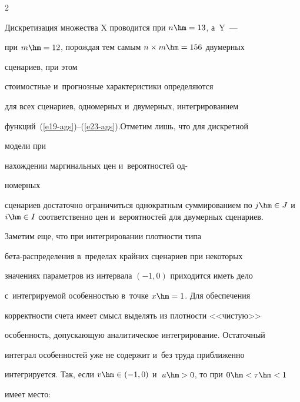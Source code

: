 \begin{multicols}{2}
  


  Дискретизация множества {\sf X} проводится при $n\hm=13$, а~{\sf Y}~--- 


при $m \hm= 12$, порождая тем самым $n\times m\hm= 156$ двумерных 


сценариев, при этом\linebreak


 стоимостные и~прогнозные характеристики опре\-деляются 


для всех сценариев, одномерных и~дву\-мерных, интегрированием 


функций~(\ref{e19-ags})--(\ref{e23-ags}).\linebreak Отметим лишь, что для дискретной 


модели при


 нахождении маргинальных цен и~вероятностей од-\linebreak\vspace*{-12pt}





\columnbreak





\noindent


номерных 


сценариев достаточно ограничиться однократным суммированием по $j\hm\in 


J$ и~$i\hm\in I$ соответственно цен и~вероятностей для двумерных сценариев. 


  


  Заметим еще, что при интегрировании плот\-ности типа 


 бе\-та-рас\-пре\-де\-ле\-ния в~пределах крайних сценариев при некоторых 


значениях параметров из интервала $(-1, 0)$ приходится иметь дело 


с~интегрируемой особенностью в~точке $x\hm= 1$. Для обеспечения 


корректности счета имеет смысл выделять из плотности <<чистую>> 


особенность, допускающую аналитическое интегрирование. Остаточный 


интеграл особенностей уже не содержит и~без труда приближенно 


интегрируется. Так, если $v\hm\in (-1,0)$ и~$u\hm>0$, то при $0\hm<\tau \hm< 1$ 


имеет место:






\end{multicols}

